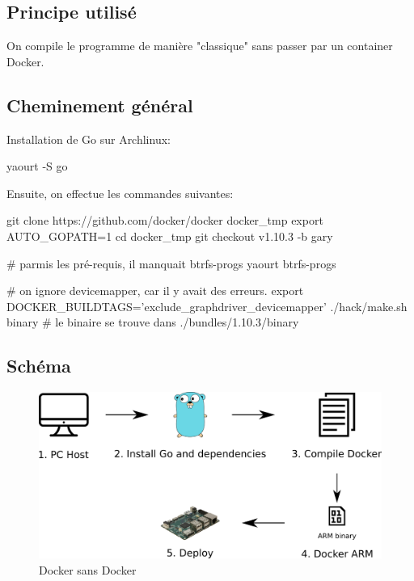 \documentclass[11pt,a4paper,oneside]{report}
\begin{document}
\subsection{Principe utilisé}

On compile le programme de manière "classique" sans passer par un container Docker.

\subsection{Cheminement général}

Installation de Go sur Archlinux:

\begin{bashcode}
yaourt -S go
\end{bashcode}

Ensuite, on effectue les commandes suivantes:

\begin{bashcode}
git clone https://github.com/docker/docker docker_tmp
export AUTO_GOPATH=1
cd docker_tmp
git checkout v1.10.3 -b gary

# parmis les pré-requis, il manquait btrfs-progs
yaourt btrfs-progs

# on ignore devicemapper, car il y avait des erreurs.
export DOCKER_BUILDTAGS='exclude_graphdriver_devicemapper'
./hack/make.sh binary
# le binaire se trouve dans ./bundles/1.10.3/binary
\end{bashcode}

\subsection{Schéma}

\begin{figure}[H]
    \begin{center}
        \includegraphics[scale=0.6]{img/docker_without_docker}
    \end{center}
    \caption{Docker sans Docker}
    \label{fig_docker_without_docker}
\end{figure}
\end{document}
